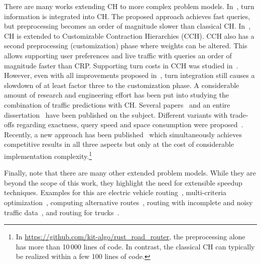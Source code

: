 \documentclass[manuscript]{acmart}
\begin{document}
There are many works extending CH to more complex problem models.
In~\cite{gv-errnt-11}, turn information is integrated into CH.
The proposed approach achieves fast queries, but preprocessing becomes an order of magnitude slower than classical CH.
In~\cite{dsw-cch-15}, CH is extended to Customizable Contraction Hierarchies (CCH).
CCH also has a second preprocessing (customization) phase where weights can be altered.
This allows supporting user preferences and live traffic with queries an order of magnitude faster than CRP.
Supporting turn costs in CCH was studied in~\cite{bwzz-cchtc-20}.
However, even with all improvements proposed in~\cite{bwzz-cchtc-20}, turn integration still causes a slowdown of at least factor three to the customization phase.
A considerable amount of research and engineering effort has been put into studying the combination of traffic predictions with CH.
Several papers~\cite{bdsv-tdch-09,bgns-tdcha-10,klsv-dtdch-10,bgsv-mtdtt-13} and an entire dissertation~\cite{b-tdrpc-14} have been published on the subject.
Different variants with trade-offs regarding exactness, query speed and space consumption were proposed~\cite{bgsv-mtdtt-13}.
Recently, a new approach has been published~\cite{swz-sfert-21} which simultaneously achieves competitive results in all three aspects but only at the cost of considerable implementation complexity.\footnote{In \url{https://github.com/kit-algo/rust_road_router}, the preprocessing alone has more than 10\,000 lines of code. In contrast, the classical CH can typically be realized within a few 100 lines of code.}

Finally, note that there are many other extended problem models.
While they are beyond the scope of this work, they highlight the need for extensible speedup techniques.
Examples for this are electric vehicle routing~\cite{DBLP:journals/algorithmica/BaumDPSWZ20,DBLP:conf/aaai/EisnerFS11},
multi-criteria optimization~\cite{fns-opca-14,gks-rpfof-10},
computing alternative routes~\cite{bdgs-argrn-11,adgw-arrn-13},
routing with incomplete and noisy traffic data~\cite{dss-tarrn-18},
and routing for trucks~\cite{kswz-erptd-p-20}.

\end{document}

